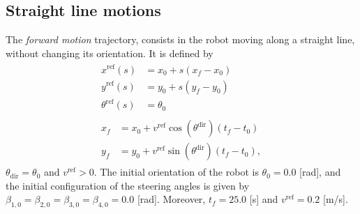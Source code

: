 \subsection{Straight line motions}
The \textit{forward motion} trajectory, consists in the robot moving along a straight line, without changing its orientation. It is defined by
\begin{equation*}
\renewcommand{\arraystretch}{1.3}
\begin{array}{c}
    \begin{aligned}
        x^{\mathrm{ref}}(s) &= x_0 + s (x_f - x_0) \\
        y^{\mathrm{ref}}(s) &= y_0 + s (y_f - y_0) \\
        \theta^{\mathrm{ref}}(s) &= \theta_0
    \end{aligned}  \\
    \begin{aligned}
        x_f &= x_0 + v^{\mathrm{ref}} \cos(\theta^{\mathrm{dir}}) (t_f - t_0) \\
        y_f &= y_0 + v^{\mathrm{ref}} \sin(\theta^{\mathrm{dir}}) (t_f - t_0),
     \end{aligned}
\end{array}
\end{equation*}
$\theta_{\mathrm{dir}}=\theta_0$ and $v^{\mathrm{ref}}>0$. The initial orientation of the robot is $\theta_0=0.0$ [rad], and the initial configuration of the steering angles is given by$\beta_{1,0}=\beta_{2,0}=\beta_{3,0}=\beta_{4,0}=0.0$ [rad]. Moreover, $t_f = 25.0$ [s] and $v^{\mathrm{ref}}=0.2$ [m/s].%

